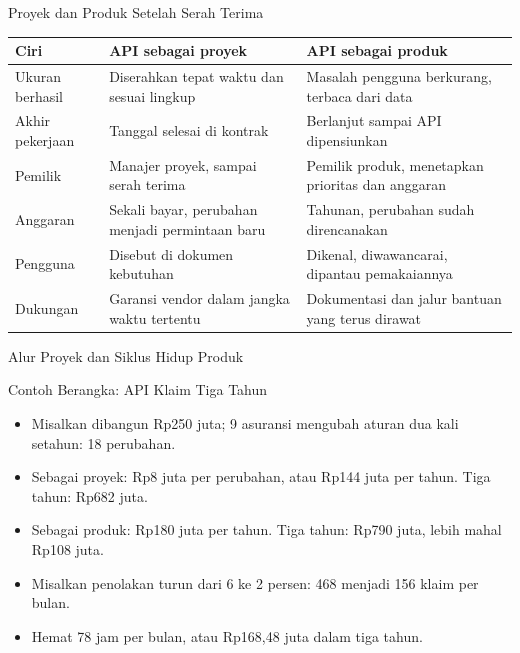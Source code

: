 \documentclass[aspectratio=169, table, 12pt]{beamer}
\begin{document}
\begin{frame}{{\Large Proyek dan Produk Setelah Serah Terima}}
  \footnotesize
  \begin{tabularx}{\textwidth}{>{\raggedright\arraybackslash}p{2.6cm}
      >{\raggedright\arraybackslash}X >{\raggedright\arraybackslash}X}
    \hline
    \textbf{Ciri} & \textbf{API sebagai proyek} & \textbf{API sebagai produk} \\ \hline
    Ukuran berhasil & Diserahkan tepat waktu dan sesuai lingkup & Masalah pengguna berkurang, terbaca dari data \\ \hline
    Akhir pekerjaan & Tanggal selesai di kontrak & Berlanjut sampai API dipensiunkan \\ \hline
    Pemilik & Manajer proyek, sampai serah terima & Pemilik produk, menetapkan prioritas dan anggaran \\ \hline
    Anggaran & Sekali bayar, perubahan menjadi permintaan baru & Tahunan, perubahan sudah direncanakan \\ \hline
    Pengguna & Disebut di dokumen kebutuhan & Dikenal, diwawancarai, dipantau pemakaiannya \\ \hline
    Dukungan & Garansi vendor dalam jangka waktu tertentu & Dokumentasi dan jalur bantuan yang terus dirawat \\ \hline
  \end{tabularx}
\end{frame}

\begin{frame}{{\Large Alur Proyek dan Siklus Hidup Produk}}
  \centering
\end{frame}

\begin{frame}{{\Large Contoh Berangka: API Klaim Tiga Tahun}}
  \vspace{10pt}
  \begin{itemize}
    \item Misalkan dibangun Rp250 juta; 9 asuransi mengubah aturan dua kali setahun: 18 perubahan.
    \item Sebagai proyek: Rp8 juta per perubahan, atau Rp144 juta per tahun. Tiga tahun: Rp682 juta.
    \item Sebagai produk: Rp180 juta per tahun. Tiga tahun: Rp790 juta, lebih mahal Rp108 juta.
    \item Misalkan penolakan turun dari 6 ke 2 persen: 468 menjadi 156 klaim per bulan.
    \item Hemat 78 jam per bulan, atau Rp168,48 juta dalam tiga tahun.
  \end{itemize}
\end{frame}
\end{document}
